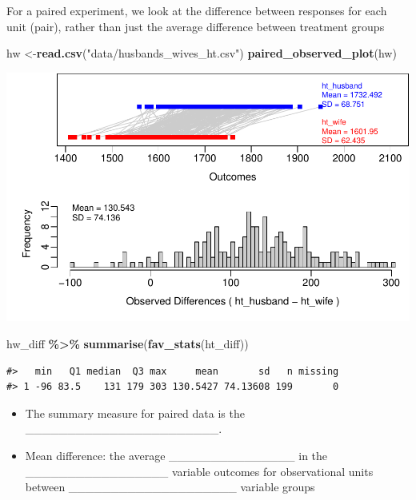 \documentclass[
]{report}
\newenvironment{Shaded}{\begin{snugshade}}{\end{snugshade}}
\newcommand{\FunctionTok}[1]{\textcolor[rgb]{0.13,0.29,0.53}{\textbf{#1}}}
\newcommand{\NormalTok}[1]{#1}
\newcommand{\OtherTok}[1]{\textcolor[rgb]{0.56,0.35,0.01}{#1}}
\newcommand{\SpecialCharTok}[1]{\textcolor[rgb]{0.81,0.36,0.00}{\textbf{#1}}}
\newcommand{\StringTok}[1]{\textcolor[rgb]{0.31,0.60,0.02}{#1}}
\providecommand{\tightlist}{%
  \setlength{\itemsep}{0pt}\setlength{\parskip}{0pt}}
\begin{document}
For a paired experiment, we look at the difference between responses for each unit (pair), rather than just the average difference between treatment groups

\begin{Shaded}
\begin{Highlighting}[]
\NormalTok{hw }\OtherTok{\textless{}{-}}\FunctionTok{read.csv}\NormalTok{(}\StringTok{"data/husbands\_wives\_ht.csv"}\NormalTok{)}
\FunctionTok{paired\_observed\_plot}\NormalTok{(hw)}
\end{Highlighting}
\end{Shaded}

\begin{center}\includegraphics[width=0.7\linewidth]{11-VN11-paired_files/figure-latex/unnamed-chunk-1-1} \end{center}

\begin{Shaded}
\begin{Highlighting}[]
\NormalTok{hw\_diff }\SpecialCharTok{\%\textgreater{}\%}
    \FunctionTok{summarise}\NormalTok{(}\FunctionTok{fav\_stats}\NormalTok{(ht\_diff))}
\end{Highlighting}
\end{Shaded}

\begin{verbatim}
#>   min   Q1 median  Q3 max     mean       sd   n missing
#> 1 -96 83.5    131 179 303 130.5427 74.13608 199       0
\end{verbatim}


\begin{itemize}
\tightlist
\item
  The summary measure for paired data is the \_\_\_\_\_\_\_\_\_\_\_\_\_\_\_\_\_\_\_\_\_\_\_.
\end{itemize}

\newpage

\begin{itemize}
\tightlist
\item
  Mean difference: the average \_\_\_\_\_\_\_\_\_\_\_\_\_\_\_ in the \_\_\_\_\_\_\_\_\_\_\_\_\_\_\_\_\_
  variable outcomes for observational units between \_\_\_\_\_\_\_\_\_\_\_\_\_\_\_\_\_\_\_\_ variable groups
\end{itemize}
\end{document}
